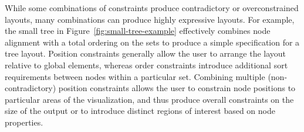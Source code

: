 While some combinations of constraints produce contradictory or overconstrained layouts,
many combinations can produce highly expressive layouts.
For example, the small tree in Figure~\ref{fig:small-tree-example}
effectively combines node alignment with a total ordering on the sets 
to produce a simple specification for a tree layout. Position constraints
generally allow the user to arrange the layout relative to global elements,
whereas order constraints introduce additional sort requirements between nodes
within a particular set. Combining multiple (non-contradictory) position
constraints allows the user to constrain node positions to particular
areas of the visualization, and thus produce overall constraints on the size of the
output or to introduce distinct regions of interest based on node properties.


